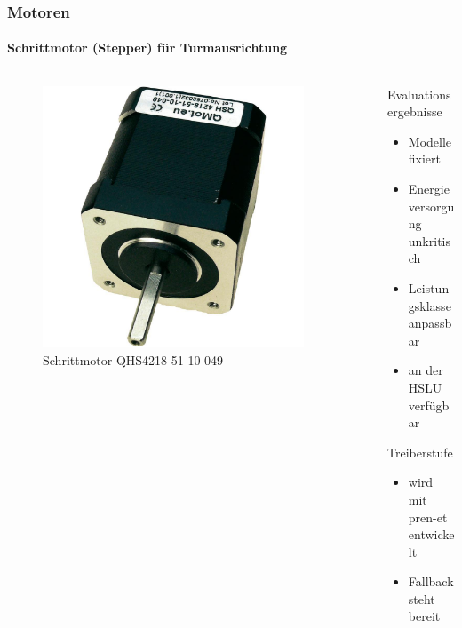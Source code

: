 \begin{frame}
	\frametitle{Motoren \hfill{} \footnotesize \group}
	\framesubtitle{Schrittmotor (Stepper) für Turmausrichtung}
	\begin{columns}
		\begin{column}{0.5\textwidth}
			\begin{figure}
				\centering
				\includegraphics[width=0.9\textwidth]{../../fig/motor/stepper_01.jpg}
				\caption{Schrittmotor QHS4218-51-10-049}
			\end{figure}
		\end{column}
		\begin{column}{0.5\textwidth}
			\begin{block}{Evaluationsergebnisse}
				\begin{itemize}
					\item Modelle fixiert
					\item Energieversorgung unkritisch
					\item Leistungsklasse anpassbar
					\item an der HSLU verfügbar
				\end{itemize}
			\end{block}
			\begin{exampleblock}{Treiberstufe}
				\begin{itemize}
					\item wird mit pren-et entwickelt
					\item Fallback steht bereit
				\end{itemize}
			\end{exampleblock}
		\end{column}
	\end{columns}
\end{frame}

